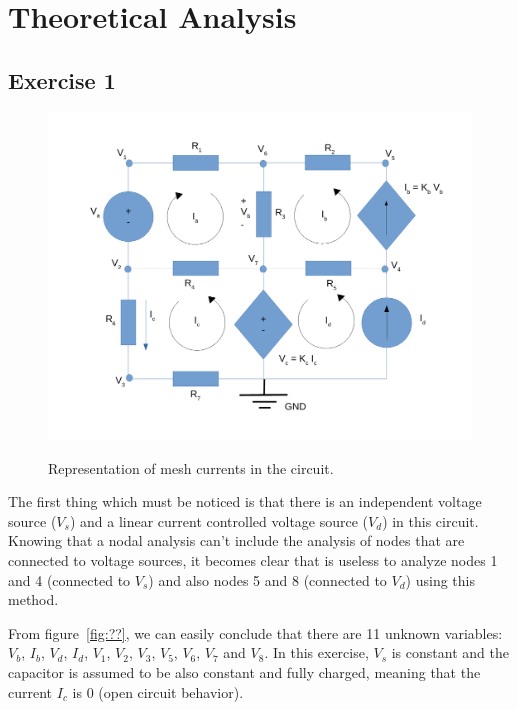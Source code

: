 \newpage
\section{Theoretical Analysis}
\label{sec:analysis}

\subsection{Exercise 1}
\label{Analysis Exercise 1}

\begin{figure}[!ht] \centering
\caption{Representation of mesh currents in the circuit.}
\includegraphics[width=0.8\linewidth]{circuit_mesh.pdf}
\label{fig:meshcurrents}
\end{figure}

 
The first thing which must be noticed is that there is an independent voltage source ($V_s$) and a linear current controlled voltage source ($V_d$) in this circuit. Knowing that a nodal analysis can't include the analysis of nodes that are connected to voltage sources, it becomes clear that is useless to analyze nodes 1 and 4 (connected to $V_s$) and also nodes 5 and 8 (connected to $V_d$) using this method.

From figure~\ref{fig:??}, we can easily conclude that there are 11 unknown variables: $V_b$, $I_b$, $V_d$, $I_d$, $V_1$, $V_2$, $V_3$, $V_5$, $V_6$, $V_7$ and $V_8$. In this exercise, $V_s$ is constant and the capacitor is assumed to be also constant and fully charged, meaning that the current $I_c$ is 0 (open circuit behavior).

